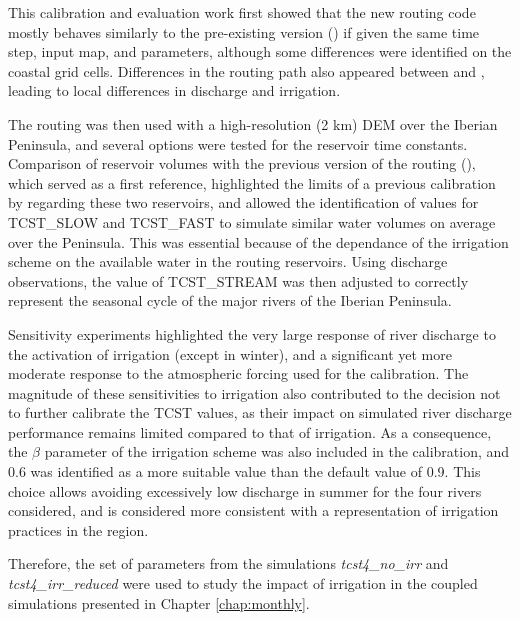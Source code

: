 This calibration and evaluation work first showed that the new routing code mostly behaves similarly to the pre-existing version (\std) if given the same time step, input map, and parameters, although some differences were identified on the coastal grid cells. Differences in the routing path also appeared between \std and \native, leading to local differences in discharge and irrigation.

The \native routing was then used with a high-resolution (2 km) DEM over the Iberian Peninsula, and several options were tested for the reservoir time constants. 
Comparison of reservoir volumes with the previous version of the routing (\std), which served as a first reference, highlighted the limits of a previous calibration by \citet{kilic_evaluation_2023} regarding these two reservoirs, and allowed the identification of values for TCST\_SLOW and TCST\_FAST to simulate similar water volumes on average over the Peninsula. This was essential because of the dependance of the irrigation scheme on the available water in the routing reservoirs.
Using discharge observations, the value of TCST\_STREAM was then adjusted to correctly represent the seasonal cycle of the major rivers of the Iberian Peninsula.

Sensitivity experiments highlighted the very large response of river discharge to the activation of irrigation (except in winter), and a significant yet more moderate response to the atmospheric forcing used for the calibration. 
The magnitude of these sensitivities to irrigation also contributed to the decision not to further calibrate the TCST values, as their impact on simulated river discharge performance remains limited compared to that of irrigation.
As a consequence, the $\beta$ parameter of the irrigation scheme was also included in the calibration, and 0.6 was identified as a more suitable value than the default value of 0.9. This choice allows avoiding excessively low discharge in summer for the four rivers considered, and is considered more consistent with a representation of irrigation practices in the region.

Therefore, the set of parameters from the simulations \textit{tcst4\_no\_irr} and \textit{tcst4\_irr\_reduced} were used to study the impact of irrigation in the coupled simulations presented in Chapter \ref{chap:monthly}.

